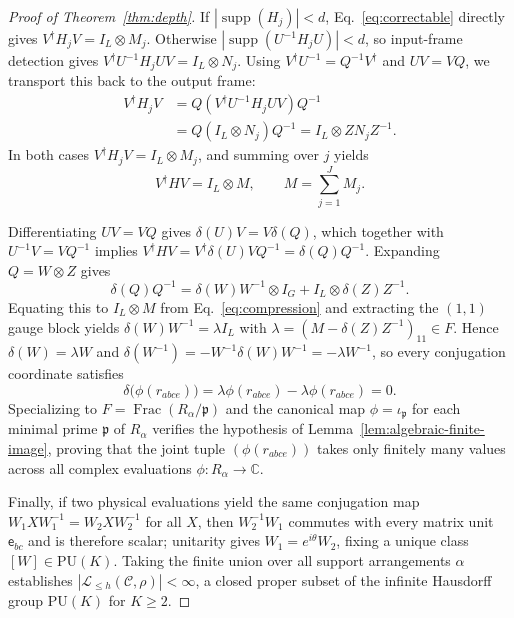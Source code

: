 \documentclass[aps,prl,reprint,notitlepage,nofootinbib,nobibnotes]{revtex4-2}
\newcommand{\PU}{\mathrm{PU}}
\newcommand{\id}{I}
\begin{document}
\begin{proof}[Proof of Theorem~\ref{thm:depth}]
If \(|\operatorname{supp}(H_j)|<d\), Eq.~\eqref{eq:correctable} directly gives \(V^\dagger H_jV=\id_L\otimes M_j\). Otherwise \(|\operatorname{supp}(U^{-1}H_jU)|<d\), so input-frame detection gives \(V^\dagger U^{-1}H_jUV=\id_L\otimes N_j\). Using \(V^\dagger U^{-1}=Q^{-1}V^\dagger\) and \(UV=VQ\), we transport this back to the output frame:
\begin{align*}
 V^\dagger H_jV &= Q(V^\dagger U^{-1}H_jUV)Q^{-1} \\
                &= Q(\id_L\otimes N_j)Q^{-1} = \id_L\otimes ZN_jZ^{-1}.
\end{align*}
In both cases \(V^\dagger H_jV=\id_L\otimes M_j\), and summing over \(j\) yields
\begin{equation}\label{eq:compression}
 V^\dagger HV=\id_L\otimes M,\qquad M=\sum_{j=1}^J M_j.
\end{equation}

Differentiating \(UV=VQ\) gives \(\delta(U)V=V\delta(Q)\), which together with \(U^{-1}V=VQ^{-1}\) implies \(V^\dagger HV=V^\dagger\delta(U)VQ^{-1}=\delta(Q)Q^{-1}\). Expanding \(Q=W\otimes Z\) gives
\begin{equation}\label{eq:logicalgen}
 \delta(Q)Q^{-1}
   =\delta(W)W^{-1}\otimes\id_G+\id_L\otimes\delta(Z)Z^{-1}.
\end{equation}
Equating this to \(\id_L\otimes M\) from Eq.~\eqref{eq:compression} and extracting the \((1,1)\) gauge block yields \(\delta(W)W^{-1}=\lambda\id_L\) with \(\lambda=(M-\delta(Z)Z^{-1})_{11}\in F\). Hence \(\delta(W)=\lambda W\) and \(\delta(W^{-1})=-W^{-1}\delta(W)W^{-1}=-\lambda W^{-1}\), so every conjugation coordinate satisfies
\[
 \delta\bigl(\phi(r_{abce})\bigr)
   =\lambda\phi(r_{abce})-\lambda\phi(r_{abce})=0.
\]
Specializing to \(F=\operatorname{Frac}(R_\alpha/\mathfrak p)\) and the canonical map \(\phi=\iota_{\mathfrak p}\) for each minimal prime \(\mathfrak p\) of \(R_\alpha\) verifies the hypothesis of Lemma~\ref{lem:algebraic-finite-image}, proving that the joint tuple \((\phi(r_{abce}))\) takes only finitely many values across all complex evaluations \(\phi:R_\alpha\to\mathbb C\).

Finally, if two physical evaluations yield the same conjugation map \(W_1XW_1^{-1}=W_2XW_2^{-1}\) for all \(X\), then \(W_2^{-1}W_1\) commutes with every matrix unit \(\mathsf e_{bc}\) and is therefore scalar; unitarity gives \(W_1=e^{i\theta}W_2\), fixing a unique class \([W]\in\PU(K)\). Taking the finite union over all support arrangements \(\alpha\) establishes \(|\mathcal L_{\le h}(\mathcal C,\rho)|<\infty\), a closed proper subset of the infinite Hausdorff group \(\PU(K)\) for \(K\ge2\).
\end{proof}
\end{document}

